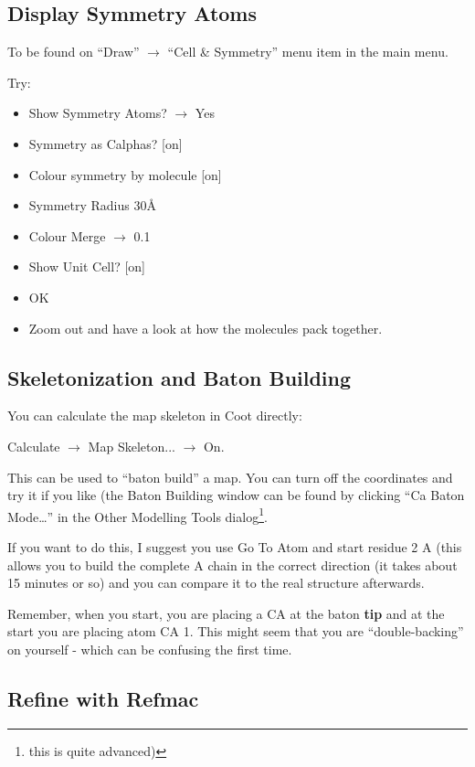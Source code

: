 \documentclass{article}
\begin{document}
\subsection{Display Symmetry Atoms}
To be found on \textsf{``Draw'' $\rightarrow$ ``Cell \& Symmetry''}
menu item in the main menu.

Try:
\begin{itemize}
\item \textsf{Show Symmetry Atoms? $\rightarrow$ Yes}
\item \textsf{Symmetry as Calphas?} [on]
\item \textsf{Colour symmetry by molecule} [on]
\item \textsf{Symmetry Radius 30\AA}
\item \textsf{Colour Merge $\rightarrow$ 0.1}
\item \textsf{Show Unit Cell?} [on]
\item \textsf{OK}
\item Zoom out and have a look at how the molecules pack together.
\end{itemize}


\subsection{Skeletonization and Baton Building}

You can calculate the map skeleton in Coot directly:

\textsf{Calculate $\rightarrow$ Map Skeleton... $\rightarrow$ On.}

This can be used to ``baton build'' a map.  You can turn off the
coordinates and try it if you like (the Baton Building window can be
found by clicking \textsf{``Ca Baton Mode\ldots''} in the Other
Modelling Tools dialog\footnote{this is quite advanced)}.
  
If you want to do this, I suggest you use Go To Atom and start residue
2 A (this allows you to build the complete A chain in the correct
direction (it takes about 15 minutes or so) and you can compare it to
the real structure afterwards.
  
  Remember, when you start, you are placing a CA at the baton
  \textbf{tip} and at the start you are placing atom CA 1.  This might
  seem that you are ``double-backing'' on yourself - which can be
  confusing the first time.

\subsection{Refine with Refmac}
\end{document}
